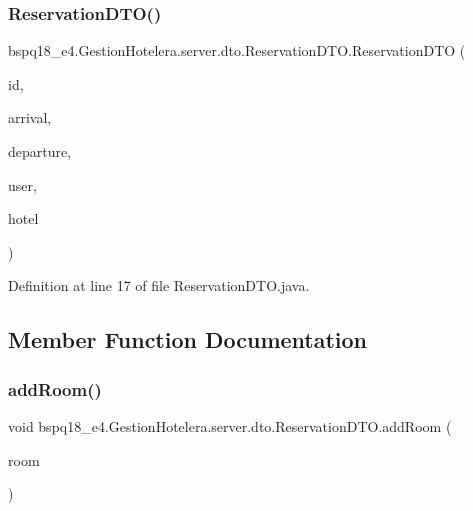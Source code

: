 \subsubsection{\texorpdfstring{Reservation\+D\+T\+O()}{ReservationDTO()}}
{\footnotesize\ttfamily bspq18\+\_\+e4.\+Gestion\+Hotelera.\+server.\+dto.\+Reservation\+D\+T\+O.\+Reservation\+D\+TO (\begin{DoxyParamCaption}\item[{int}]{id,  }\item[{Date}]{arrival,  }\item[{Date}]{departure,  }\item[{\mbox{\hyperlink{classbspq18__e4_1_1_gestion_hotelera_1_1server_1_1dto_1_1_user_d_t_o}{User\+D\+TO}}}]{user,  }\item[{\mbox{\hyperlink{classbspq18__e4_1_1_gestion_hotelera_1_1server_1_1dto_1_1_hotel_d_t_o}{Hotel\+D\+TO}}}]{hotel }\end{DoxyParamCaption})}



Definition at line 17 of file Reservation\+D\+T\+O.\+java.



\subsection{Member Function Documentation}
\mbox{\label{classbspq18__e4_1_1_gestion_hotelera_1_1server_1_1dto_1_1_reservation_d_t_o_ab0c54a6b7c8f481b3f83caeebf214506}} 
\subsubsection{\texorpdfstring{add\+Room()}{addRoom()}}
{\footnotesize\ttfamily void bspq18\+\_\+e4.\+Gestion\+Hotelera.\+server.\+dto.\+Reservation\+D\+T\+O.\+add\+Room (\begin{DoxyParamCaption}\item[{\mbox{\hyperlink{classbspq18__e4_1_1_gestion_hotelera_1_1server_1_1dto_1_1_room_d_t_o}{Room\+D\+TO}}}]{room }\end{DoxyParamCaption})}



